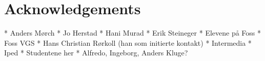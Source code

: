 \section*{Acknowledgements}

* Anders Mørch
* Jo Herstad
* Hani Murad
* Erik Steineger
* Elevene på Foss
* Foss VGS
* Hans Christian Rørkoll (han som initierte kontakt)
* Intermedia
* Iped
* Studentene her
* Alfredo, Ingeborg, Anders Kluge?

\newpage